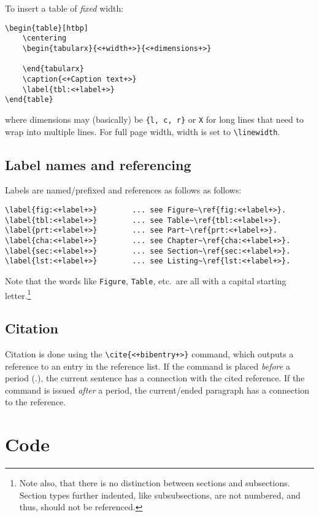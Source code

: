 To insert a table of \emph{fixed} width:
\begin{verbatim}
\begin{table}[htbp]
    \centering
    \begin{tabularx}{<+width+>}{<+dimensions+>}

    \end{tabularx}
    \caption{<+Caption text+>}
    \label{tbl:<+label+>}
\end{table}
\end{verbatim}
where dimensions may (basically) be \texttt{\{l, c, r\}} or \texttt{X} for long lines that need to wrap into multiple lines. For full page width, width is set to \verb|\linewidth|.


\subsection{Label names and referencing}
Labels are named\slash prefixed and references as follows as follows:
\begin{verbatim}
\label{fig:<+label+>}        ... see Figure~\ref{fig:<+label+>}. 
\label{tbl:<+label+>}        ... see Table~\ref{tbl:<+label+>}.
\label{prt:<+label+>}        ... see Part~\ref{prt:<+label+>}.
\label{cha:<+label+>}        ... see Chapter~\ref{cha:<+label+>}.
\label{sec:<+label+>}        ... see Section~\ref{sec:<+label+>}.
\label{lst:<+label+>}        ... see Listing~\ref{lst:<+label+>}.
\end{verbatim}
Note that the words like \texttt{Figure}, \texttt{Table}, etc.\ are all with a capital starting letter.\footnote{Note also, that there is no distinction between sections and subsections. Section types further indented, like subsubsections, are not numbered, and thus, should not be referenced.}


\subsection{Citation}
Citation is done using the \verb|\cite{<+bibentry+>}| command, which outputs a reference to an entry in the reference list. If the command is placed \emph{before} a period (.), the current sentence has a connection with the cited reference. If the command is issued \emph{after} a period, the current\slash ended paragraph has a connection to the reference.


\section{Code}
\label{sec:code}

